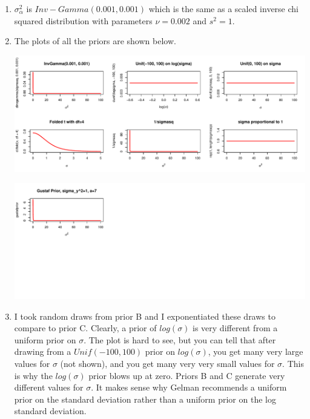 \documentclass[12pt]{article}\usepackage[]{graphicx}\usepackage[]{color}
\newenvironment{knitrout}{}{} %
\begin{document}
\begin{doublespacing}
\begin{enumerate}
\begin{enumerate}
\item $\sigma_{\alpha}^2$ is $Inv-Gamma(0.001, 0.001)$ which is the same as a scaled inverse chi squared distribution with parameters $\nu=0.002$ and $s^2=1$.

\item The plots of all the priors are shown below.

\begin{knitrout}\footnotesize
{}\color{fgcolor}
\includegraphics[width=\linewidth]{figure/plotprior1} 

\includegraphics[width=\linewidth]{figure/plotprior2} 

\end{knitrout}

\item I took random draws from prior B and I exponentiated these draws to compare to prior C. Clearly, a prior of $log(\sigma)$ is very different from a uniform prior on $\sigma$. The plot is hard to see, but you can tell that after drawing from a $Unif(-100, 100)$ prior on $log(\sigma)$, you get many very large values for $\sigma$ (not shown), and you get many very very small values for $\sigma$. This is why the $log(\sigma)$ prior blows up at zero. Priors B and C generate very different values for $\sigma$. It makes sense why Gelman recommends a uniform prior on the standard deviation rather than a uniform prior on the log standard deviation.


\end{enumerate}
\end{enumerate}
\end{doublespacing}
\end{document}
